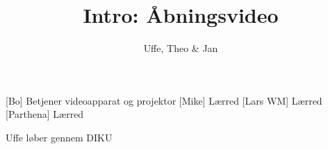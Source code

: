 \documentclass[danish]{article}
\title{Intro: Åbningsvideo}
\author{Uffe, Theo \& Jan}
\begin{document}
\maketitle

\begin{roles}
  [Bo] Betjener videoapparat og projektor
  [Mike] Lærred
  [Lars WM] Lærred
  [Parthena] Lærred
\end{roles}

\begin{sketch}

\scene Uffe løber gennem DIKU

\end{sketch}
\end{document}
